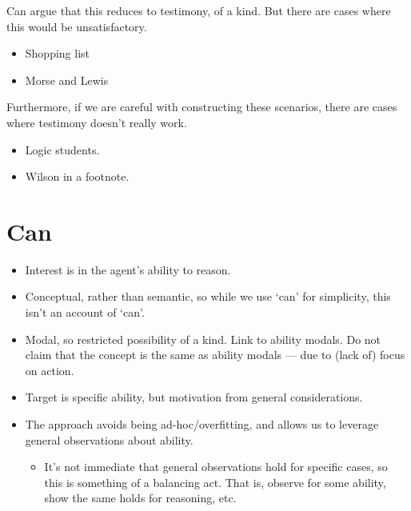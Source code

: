 \documentclass[10pt]{article}
\begin{document}
{
  \color{red}
  Can argue that this reduces to testimony, of a kind.
  But there are cases where this would be unsatisfactory.
  \begin{itemize}
  \item Shopping list
  \item Morse and Lewis
  \end{itemize}
  Furthermore, if we are careful with constructing these scenarios, there are cases where testimony doesn't really work.
  \begin{itemize}
  \item Logic students.
  \item Wilson in a footnote.
  \end{itemize}
}

\section{Can}
\label{sec:can}

\begin{itemize}
\item Interest is in the agent's ability to reason.
\item Conceptual, rather than semantic, so while we use `can' for simplicity, this isn't an account of `can'.
\item Modal, so restricted possibility of a kind.
  Link to ability modals.
  Do not claim that the concept is the same as ability modals --- due to (lack of) focus on action.
\item Target is specific ability, but motivation from general considerations.
\item The approach avoids being ad-hoc/overfitting, and allows us to leverage general observations about ability.
  \begin{itemize}
  \item It's not immediate that general observations hold for specific cases, so this is something of a balancing act.
    That is, observe for some ability, show the same holds for reasoning, etc.\
  \end{itemize}
\end{itemize}
\end{document}

